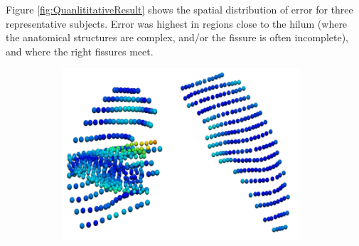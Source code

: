 {Figure \ref{fig:QuanlititativeResult} shows the spatial distribution of error for three representative subjects. Error was highest in regions close to the hilum (where the anatomical structures are complex, and/or the fissure is often incomplete), and where the right fissures meet. 

\begin{figure}[htbp] 
\centering
\begin{subfigure}{.3\linewidth}%
  \includegraphics[width=\linewidth,trim={{.0\wd0} {.0\wd0} {.0\wd0} {.0\wd0}},clip]{Segmentation/Image/QuanlititativeResult1.png} %
  \caption{}
  \label{fig:QuanlititativeResult-a} 
\end{subfigure} 
\begin{subfigure}{.3\linewidth}%

\end{subfigure}
\end{figure}}
